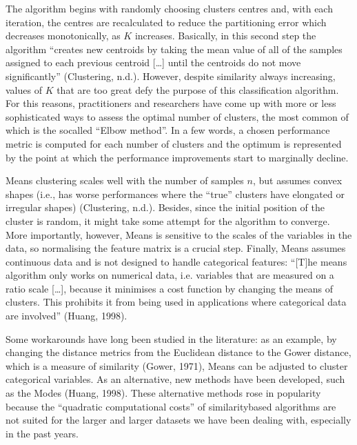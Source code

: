 \documentclass[letterpaper,10pt,english]{jupyterBook}
\begin{document}
\sphinxAtStartPar
The algorithm begins with randomly choosing clusters centres and, with each iteration, the centres are re\sphinxhyphen{}calculated to reduce the partitioning error \sphinxhyphen{} which decreases monotonically, as \(K\) increases. Basically, in this second step the algorithm “creates new centroids by taking the mean value of all of the samples assigned to each previous centroid {[}…{]} until the centroids do not move significantly” (Clustering, n.d.). However, despite similarity always increasing, values of \(K\) that are too great defy the purpose of this classification algorithm. For this reasons, practitioners and researchers have come up with more or less sophisticated ways to assess the optimal number of clusters, the most common of which is the so\sphinxhyphen{}called “Elbow method”. In a few words, a chosen performance metric is computed for each number of clusters and the optimum is represented by the point at which the performance improvements start to marginally decline.

\sphinxAtStartPar
{}\sphinxhyphen{}Means clustering scales well with the number of samples \(n\), but assumes convex shapes (i.e., has worse performances where the “true” clusters have elongated or irregular shapes) (Clustering, n.d.). Besides, since the initial position of the cluster is random, it might take some attempt for the algorithm to converge. More importantly, however, \sphinxhyphen{}Means is sensitive to the scales of the variables in the data, so normalising the feature matrix is a crucial step. Finally, \sphinxhyphen{}Means assumes continuous data and is not designed to handle categorical features: “{[}T{]}he \sphinxhyphen{}means algorithm only works on numerical data, i.e. variables that are measured on a ratio scale {[}…{]}, because it minimises a cost function by changing the means of clusters. This prohibits it from being used in applications where categorical data are involved” (Huang, 1998).

\sphinxAtStartPar
Some workarounds have long been studied in the literature: as an example, by changing the distance metrics from the Euclidean distance to the Gower distance, which is a measure of similarity (Gower, 1971), \sphinxhyphen{}Means can be adjusted to cluster categorical variables. As an alternative, new methods have been developed, such as the \sphinxhyphen{}Modes (Huang, 1998). These alternative methods rose in popularity because the “quadratic computational costs” of similarity\sphinxhyphen{}based algorithms are not suited for the larger and larger datasets we have been dealing with, especially in the past years.
\end{document}
